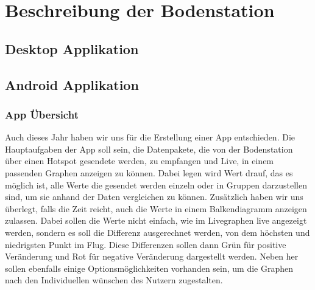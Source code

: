 \section{Beschreibung der Bodenstation}
\subsection{Desktop Applikation}



















\subsection{Android Applikation}
\subsubsection{App Übersicht}
Auch dieses Jahr haben wir uns für die Erstellung einer App entschieden. Die Hauptaufgaben der App soll sein, die Datenpakete, die von der Bodenstation über einen Hotspot gesendete werden, zu empfangen und Live, in einem passenden Graphen anzeigen zu können. Dabei legen wird Wert drauf, das es möglich ist, alle Werte die gesendet werden einzeln oder in Gruppen darzustellen sind, um sie anhand der Daten vergleichen zu können. Zusätzlich haben wir uns überlegt, falls die Zeit reicht, auch die Werte in einem Balkendiagramm anzeigen zulassen. Dabei sollen die Werte nicht einfach, wie im Livegraphen live angezeigt werden, sondern es soll die Differenz ausgerechnet werden, von dem höchsten und niedrigsten Punkt im Flug. Diese Differenzen sollen dann Grün für positive Veränderung und Rot für negative Veränderung dargestellt werden. Neben her sollen ebenfalls einige Optionsmöglichkeiten vorhanden sein, um die Graphen nach den Individuellen wünschen des Nutzern zugestalten.


